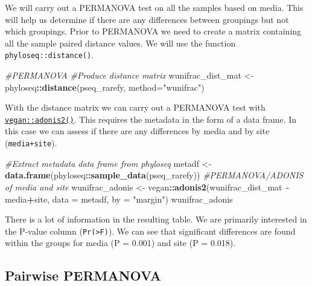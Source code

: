 \documentclass[
]{book}
\newenvironment{Shaded}{\begin{snugshade}}{\end{snugshade}}
\newcommand{\AttributeTok}[1]{\textcolor[rgb]{0.13,0.29,0.53}{#1}}
\newcommand{\CommentTok}[1]{\textcolor[rgb]{0.56,0.35,0.01}{\textit{#1}}}
\newcommand{\FunctionTok}[1]{\textcolor[rgb]{0.13,0.29,0.53}{\textbf{#1}}}
\newcommand{\NormalTok}[1]{#1}
\newcommand{\OtherTok}[1]{\textcolor[rgb]{0.56,0.35,0.01}{#1}}
\newcommand{\SpecialCharTok}[1]{\textcolor[rgb]{0.81,0.36,0.00}{\textbf{#1}}}
\newcommand{\StringTok}[1]{\textcolor[rgb]{0.31,0.60,0.02}{#1}}
\begin{document}
We will carry out a PERMANOVA test on all the samples based on media.
This will help us determine if there are any differences between groupings but not which groupings.
Prior to PERMANOVA we need to create a matrix containing all the sample paired distance values.
We will use the function \texttt{phyloseq::distance()}.

\begin{Shaded}
\begin{Highlighting}[]
\CommentTok{\#PERMANOVA}
\CommentTok{\#Produce distance matrix}
\NormalTok{wunifrac\_dist\_mat }\OtherTok{\textless{}{-}}\NormalTok{ phyloseq}\SpecialCharTok{::}\FunctionTok{distance}\NormalTok{(pseq\_rarefy, }\AttributeTok{method=}\StringTok{"wunifrac"}\NormalTok{)}
\end{Highlighting}
\end{Shaded}

With the distance matrix we can carry out a PERMANOVA test with \href{https://search.r-project.org/CRAN/refmans/vegan/html/adonis.html}{\texttt{vegan::adonis2()}}.
This requires the metadata in the form of a data frame.
In this case we can assess if there are any differences by media and by site (\texttt{media+site}).

\begin{Shaded}
\begin{Highlighting}[]
\CommentTok{\#Extract metadata data frame from phyloseq}
\NormalTok{metadf }\OtherTok{\textless{}{-}} \FunctionTok{data.frame}\NormalTok{(phyloseq}\SpecialCharTok{::}\FunctionTok{sample\_data}\NormalTok{(pseq\_rarefy))}
\CommentTok{\#PERMANOVA/ADONIS of media and site}
\NormalTok{wunifrac\_adonis }\OtherTok{\textless{}{-}}\NormalTok{ vegan}\SpecialCharTok{::}\FunctionTok{adonis2}\NormalTok{(wunifrac\_dist\_mat }\SpecialCharTok{\textasciitilde{}}\NormalTok{ media}\SpecialCharTok{+}\NormalTok{site, }\AttributeTok{data =}\NormalTok{ metadf, }\AttributeTok{by =} \StringTok{"margin"}\NormalTok{)}
\NormalTok{wunifrac\_adonis}
\end{Highlighting}
\end{Shaded}

There is a lot of information in the resulting table.
We are primarily interested in the P-value column (\texttt{Pr(\textgreater{}F)}).
We can see that significant differences are found within the groups for media (P = 0.001) and site (P = 0.018).

\hypertarget{pairwise-permanova}{%
\subsection{Pairwise PERMANOVA}\label{pairwise-permanova}}
\end{document}
